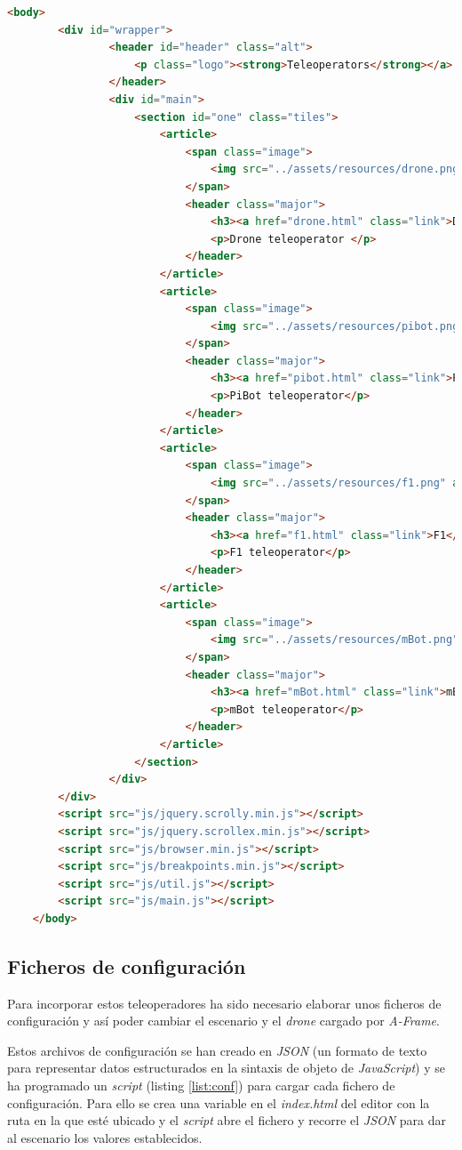 \begin{lstlisting}[language=html,label=list:teleop,caption=Código HTML de la interfaz para acceder a los teleoperadores]
	<body>
		<div id="wrapper">
				<header id="header" class="alt">
					<p class="logo"><strong>Teleoperators</strong></a>
				</header>
				<div id="main">
					<section id="one" class="tiles">
						<article>
							<span class="image">
								<img src="../assets/resources/drone.png" alt="drone"/>
							</span>
							<header class="major">
								<h3><a href="drone.html" class="link">Drone</a></h3>
								<p>Drone teleoperator </p>
							</header>
						</article>
						<article>
							<span class="image">
								<img src="../assets/resources/pibot.png" alt="piBot"/>
							</span>
							<header class="major">
								<h3><a href="pibot.html" class="link">PiBot</a></h3>
								<p>PiBot teleoperator</p>
							</header>
						</article>
						<article>
							<span class="image">
								<img src="../assets/resources/f1.png" alt="f1"/>
							</span>
							<header class="major">
								<h3><a href="f1.html" class="link">F1</a></h3>
								<p>F1 teleoperator</p>
							</header>
						</article>
						<article>
							<span class="image">
								<img src="../assets/resources/mBot.png" alt="mbot"/>
							</span>
							<header class="major">
								<h3><a href="mBot.html" class="link">mBot</a></h3>
								<p>mBot teleoperator</p>
							</header>
						</article>
					</section>
				</div>
		</div>
		<script src="js/jquery.scrolly.min.js"></script>
		<script src="js/jquery.scrollex.min.js"></script>
		<script src="js/browser.min.js"></script>
		<script src="js/breakpoints.min.js"></script>
		<script src="js/util.js"></script>
		<script src="js/main.js"></script>
	</body>
\end{lstlisting}

\subsection{Ficheros de configuración}

Para incorporar estos teleoperadores ha sido necesario elaborar unos ficheros de configuración y así poder cambiar el escenario y el \textit{drone} cargado por \textit{A-Frame}. 

Estos archivos de configuración se han creado en \textit{JSON} (un formato de texto para representar datos estructurados en la sintaxis de objeto de \textit{JavaScript}) y se ha programado un \textit{script} (listing \ref{list:conf}) para cargar cada fichero de configuración. Para ello se crea una variable en el \textit{index.html} del editor con la ruta en la que esté ubicado y el \textit{script} abre el fichero y recorre el \textit{JSON} para dar al escenario los valores establecidos.

